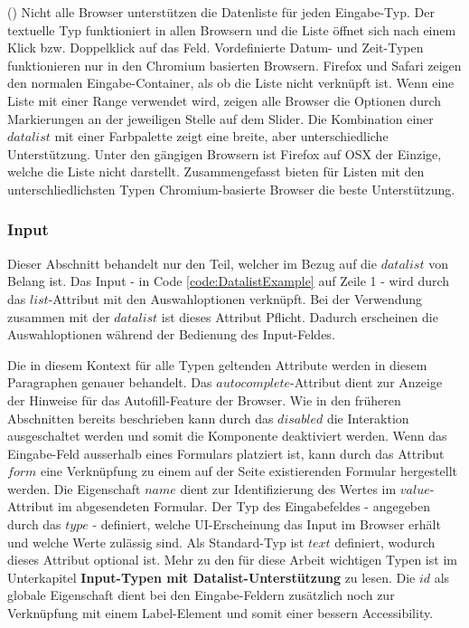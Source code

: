 (\cite{datalistMdn}) Nicht alle Browser unterstützen die Datenliste für jeden Eingabe-Typ.
Der textuelle Typ funktioniert in allen Browsern und die Liste öffnet sich nach einem Klick bzw. Doppelklick auf das Feld.
Vordefinierte Datum- und Zeit-Typen funktionieren nur in den Chromium basierten Browsern. 
Firefox und Safari zeigen den normalen Eingabe-Container, als ob die Liste nicht verknüpft ist.
Wenn eine Liste mit einer Range verwendet wird, zeigen alle Browser die Optionen durch Markierungen an der jeweiligen Stelle auf dem Slider.
Die Kombination einer $datalist$ mit einer Farbpalette zeigt eine breite, aber unterschiedliche Unterstützung. 
Unter den gängigen Browsern ist Firefox auf OSX der Einzige, welche die Liste nicht darstellt.
Zusammengefasst bieten für Listen mit den unterschliedlichsten Typen Chromium-basierte Browser die beste Unterstützung.


\subsubsection{\color{dgray} Input}

Dieser Abschnitt behandelt nur den Teil, welcher im Bezug auf die $datalist$ von Belang ist.
Das Input - in Code \ref{code:DatalistExample} auf Zeile 1 - wird durch das $list$-Attribut mit den Auswahloptionen verknüpft.
Bei der Verwendung zusammen mit der $datalist$ ist dieses Attribut Pflicht.
Dadurch erscheinen die Auswahloptionen während der Bedienung des Input-Feldes. 

Die in diesem Kontext für alle Typen geltenden Attribute werden in diesem Paragraphen genauer behandelt.
Das $autocomplete$-Attribut dient zur Anzeige der Hinweise für das Autofill-Feature der Browser.
Wie in den früheren Abschnitten bereits beschrieben kann durch das $disabled$ die Interaktion ausgeschaltet werden und somit die Komponente deaktiviert werden.
Wenn das Eingabe-Feld ausserhalb eines Formulars platziert ist, kann durch das Attribut $form$ eine Verknüpfung zu einem auf der Seite existierenden Formular hergestellt werden.
Die Eigenschaft $name$ dient zur Identifizierung des Wertes im $value$-Attribut im abgesendeten Formular.
Der Typ des Eingabefeldes - angegeben durch das $type$ - definiert, welche UI-Erscheinung das Input im Browser erhält und welche Werte zulässig sind.
Als Standard-Typ ist $text$ definiert, wodurch dieses Attribut optional ist.
Mehr zu den für diese Arbeit wichtigen Typen ist im Unterkapitel \textbf{Input-Typen mit Datalist-Unterstützung} zu lesen.
Die $id$ als globale Eigenschaft dient bei den Eingabe-Feldern zusätzlich noch zur Verknüpfung mit einem Label-Element und somit einer bessern Accessibility.

